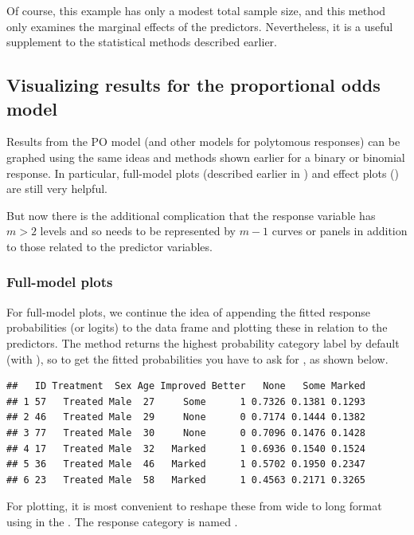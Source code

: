 \documentclass[11pt]{book}
\renewenvironment{knitrout}{\small\renewcommand{\baselinestretch}{.85}}{} %
\begin{document}
Of course, this example has only a modest total sample size, and this method
only examines the marginal effects of the predictors.  Nevertheless, it is
a useful supplement to the statistical methods described earlier.


\subsection{Visualizing results for the proportional odds model}\label{sec:vis-propodds}
Results from the PO model (and other models for polytomous responses)
can be graphed using the same ideas and methods shown
earlier for a binary or binomial response.  In particular,
full-model plots (described earlier in ) and effect plots
() are still very helpful. 

But now there is the additional complication that the response variable has $m > 2$
levels and so needs to be represented by $m-1$ curves or panels
in addition to those related to the predictor variables.

\subsubsection{Full-model plots}\label{sec:po-fullplots}
For full-model plots, we continue the idea of appending the fitted response probabilities
(or logits) to the data frame and plotting these in relation to the predictors.
The  method returns the highest probability category label by default
(with ),
so to get the fitted probabilities you have to ask for , as shown below.

\begin{knitrout}
\color{fgcolor}\begin{kframe}
\begin{alltt}
 \hlkwb{<-} 
                   \hlstd{=}\hlstd{))}
\end{alltt}
\begin{verbatim}
##   ID Treatment  Sex Age Improved Better   None   Some Marked
## 1 57   Treated Male  27     Some      1 0.7326 0.1381 0.1293
## 2 46   Treated Male  29     None      0 0.7174 0.1444 0.1382
## 3 77   Treated Male  30     None      0 0.7096 0.1476 0.1428
## 4 17   Treated Male  32   Marked      1 0.6936 0.1540 0.1524
## 5 36   Treated Male  46   Marked      1 0.5702 0.1950 0.2347
## 6 23   Treated Male  58   Marked      1 0.4563 0.2171 0.3265
\end{verbatim}
\end{kframe}
\end{knitrout}
For plotting, it is most convenient to reshape these from wide to long format
using  in the .  The response category is named
.
\end{document}
